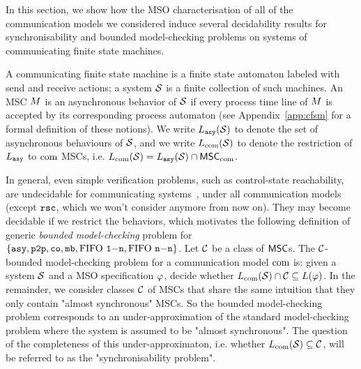 

In this section, we show how the MSO characterisation of all of the communication
models we considered induce several decidability results for
synchronisability and bounded model-checking problems on systems of
communicating finite state machines.

A communicating finite state machine is a finite state automaton labeled with send
and receive actions; a system $\mathcal{S}$ is a finite collection of such machines.
An MSC $M$ is an asynchronous behavior of $\mathcal{S}$ if every process
time line of $M$ is accepted by its corresponding process automaton
\ifappendix
(see Appendix~\ref{app:cfsm} for a formal definition of these notions).
\fi
We write $L_{\mathtt{asy}}(\mathcal{S})$ to denote the set of asynchronous behaviours of $\mathcal{S}$,
and we write $L_{\textup{com}}(\mathcal{S})$ to denote the restriction of $L_{\mathtt{asy}}$ to $\textup{com}$ MSCs,
i.e. $L_{\textup{com}}(\mathcal{S})=L_{\mathtt{asy}}(\mathcal{S})\cap\mathsf{MSC}_{\textup{com}}$.

In general, even simple verification problems, such
as control-state reachability, are undecidable for
communicating systems~\cite{DBLP:journals/jacm/BrandZ83}, under all communication models (except
$\mathtt{rsc}$, which we won't consider anymore from now on).
They may become decidable if we restrict the behaviors, which motivates the following
definition of  generic \emph{bounded model-checking} problem for $\{\mathtt{asy}, \mathtt{p2p}, \mathtt{co}, \mathtt{mb}, \text{FIFO } \mathtt{1\mathsf{-}n}, \text{FIFO } \mathtt{n\mathsf{-}n} \}$. 
%
Let $\mathcal{C}$ be a class of $\mathsf{MSC}$s. The $\mathcal{C}$-bounded model-checking problem
for a communication model $\textup{com}$ is: given a system $\mathcal{S}$ and a MSO
specification $\varphi$, decide whether
$L_{\textup{com}}(\mathcal{S})\cap \mathcal{C} \subseteq L(\varphi)$.
%
In the remainder, we  consider classes $\mathcal{C}$ of MSCs that share the same intuition
that they only contain "almost synchronous" MSCs. So the bounded model-checking problem
corresponds to an under-approximation of the standard model-checking problem where the
system is assumed to be "almost synchronous". The question of the completeness of this under-approximaton, 
i.e. whether $L_{\textup{com}}(\mathcal{S})\subseteq \mathcal{C}$, will be 
referred to as the "synchronisability problem".


